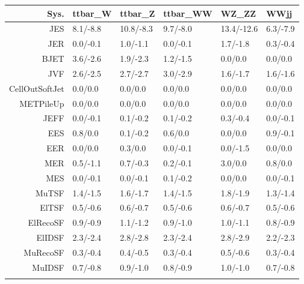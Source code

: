 \begin{tabular}{r|p{.08\linewidth}p{.08\linewidth}p{.08\linewidth}p{.08\linewidth}p{.08\linewidth}}
\toprule
 Sys.  & ttbar\_W & ttbar\_Z & ttbar\_WW & WZ\_ZZ & WWjj \\
\toprule
JES  & 8.1/-8.8 & 10.8/-8.3 & 9.7/-8.0 & 13.4/-12.6 & 6.3/-7.9 \\
JER  & 0.0/-0.1 & 1.0/-1.1 & 0.0/-0.1 & 1.7/-1.8 & 0.3/-0.4 \\
BJET  & 3.6/-2.6 & 1.9/-2.3 & 1.2/-1.5 & 0.0/0.0 & 0.0/0.0 \\
JVF  & 2.6/-2.5 & 2.7/-2.7 & 3.0/-2.9 & 1.6/-1.7 & 1.6/-1.6 \\
CellOutSoftJet  & 0.0/0.0 & 0.0/0.0 & 0.0/0.0 & 0.0/0.0 & 0.0/0.0 \\
METPileUp  & 0.0/0.0 & 0.0/0.0 & 0.0/0.0 & 0.0/0.0 & 0.0/0.0 \\
JEFF  & 0.0/-0.1 & 0.1/-0.2 & 0.1/-0.2 & 0.3/-0.4 & 0.0/-0.1 \\
EES  & 0.8/0.0 & 0.1/-0.2 & 0.6/0.0 & 0.0/0.0 & 0.9/-0.1 \\
EER  & 0.0/0.0 & 0.3/0.0 & 0.0/-0.1 & 0.0/-1.5 & 0.0/0.0 \\
MER  & 0.5/-1.1 & 0.7/-0.3 & 0.2/-0.1 & 3.0/0.0 & 0.8/0.0 \\
MES  & 0.0/-0.1 & 0.0/-0.1 & 0.1/-0.2 & 0.0/0.0 & 0.0/-0.1 \\
MuTSF  & 1.4/-1.5 & 1.6/-1.7 & 1.4/-1.5 & 1.8/-1.9 & 1.3/-1.4 \\
ElTSF  & 0.5/-0.6 & 0.6/-0.7 & 0.5/-0.6 & 0.6/-0.7 & 0.5/-0.6 \\
ElRecoSF  & 0.9/-0.9 & 1.1/-1.2 & 0.9/-1.0 & 1.0/-1.1 & 0.8/-0.9 \\
ElIDSF  & 2.3/-2.4 & 2.8/-2.8 & 2.3/-2.4 & 2.8/-2.9 & 2.2/-2.3 \\
MuRecoSF  & 0.3/-0.4 & 0.4/-0.5 & 0.3/-0.4 & 0.5/-0.6 & 0.3/-0.4 \\
MuIDSF  & 0.7/-0.8 & 0.9/-1.0 & 0.8/-0.9 & 1.0/-1.0 & 0.7/-0.8 \\
 \\
\bottomrule
\end{tabular}
